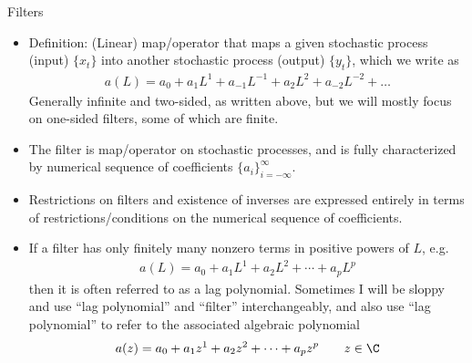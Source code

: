 \documentclass[aspectratio=169, handout]{beamer}
\begin{document}
{\scriptsize
\begin{frame}{Filters}
\begin{itemize}
  \item \alert{Definition}: (Linear) \alert{map/operator} that maps a
    given stochastic process (input) $\{x_t\}$ into another stochastic
    process (output) $\{y_t\}$, which we write as
    \begin{align*}
      a(L) = a_0 + a_1 L^1 + a_{-1}L^{-1} + a_2 L^2 + a_{-2}L^{-2} +
      \ldots
    \end{align*}
    Generally infinite and two-sided, as written above, but we will
    mostly focus on one-sided filters, some of which are finite.

    \pause
  \item The filter is map/operator on stochastic processes, and is fully
    characterized by numerical \alert{sequence of coefficients}
    $\{a_i\}_{i=-\infty}^\infty$.

  \item Restrictions on filters and existence of inverses are expressed
    entirely in terms of \alert{restrictions/conditions} on the numerical
    sequence of coefficients.

  \pause
  \item If a filter has only finitely many nonzero terms in positive
    powers of $L$, e.g.
    \begin{align*}
      a(L) =
      a_0 + a_1 L^1 + a_2 L^2
      + \cdots
      + a_pL^p
    \end{align*}
    then it is often referred to as a \alert{lag polynomial}.
    \pause
    Sometimes I will be sloppy and use ``lag polynomial'' and ``filter''
    interchangeably, and also use ``lag polynomial'' to refer to the
    associated algebraic polynomial
    \begin{align*}
      a(z) =
      a_0 + a_1 z^1 + a_2 z^2
      + \cdots
      + a_pz^p
      \qquad z\in \C
    \end{align*}

\end{itemize}
\end{frame}
}
\end{document}
